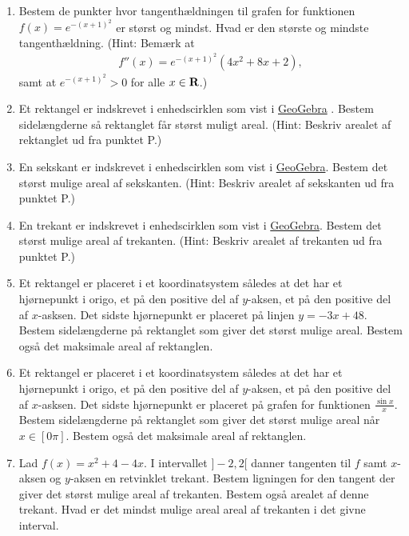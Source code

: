 \begin{enumerate}
	
	\item Bestem de punkter hvor tangenthældningen til grafen for funktionen $f(x)=e^{-(x+1)^2}$ er størst og mindst. Hvad er den største og mindste tangenthældning. (Hint:	Bemærk at 
		\begin{align*}
		f''(x)=e^{-(x+1)^2}(4x^2+8x+2),
		\end{align*}
	samt at $e^{-(x+1)^2}>0$ for alle $x\in \mathbf{R}$.)


	\item Et rektangel er indskrevet i enhedscirklen som vist i \href{https://www.geogebra.org/m/efDNd8KK}{GeoGebra} . Bestem sidelængderne så rektanglet får størst muligt areal. (Hint: Beskriv arealet af rektanglet ud fra punktet P.)
	
	\item En sekskant er indskrevet i enhedscirklen som vist i \href{https://www.geogebra.org/m/efDNd8KK}{GeoGebra}. Bestem det størst mulige areal af sekskanten. (Hint: Beskriv arealet af sekskanten ud fra punktet P.)

	\item En trekant er indskrevet i enhedscirklen som vist i \href{https://www.geogebra.org/m/efDNd8KK}{GeoGebra}. Bestem det størst mulige areal af trekanten. (Hint: Beskriv arealet af trekanten ud fra punktet P.)
	
	\item Et rektangel er placeret i et koordinatsystem således at det har et hjørnepunkt i origo, et på den positive del af $y$-aksen, et på den positive del af $x$-asksen. Det sidste hjørnepunkt er placeret på linjen $y=-3x+48$. Bestem sidelængderne på rektanglet som giver det størst mulige areal. Bestem også det maksimale areal af rektanglen.
	
	\item Et rektangel er placeret i et koordinatsystem således at det har et hjørnepunkt i origo, et på den positive del af $y$-aksen, et på den positive del af $x$-asksen. Det sidste hjørnepunkt er placeret på grafen for funktionen $\frac{\sin x}{x}$. Bestem sidelængderne på rektanglet som giver det størst mulige areal når $x\in[0\pi]$. Bestem også det maksimale areal af rektanglen.
	
	
	\item Lad $f(x)=x^2+4-4x$. I intervallet $]-2,2[ $ danner tangenten til $f$ samt $x$-aksen og $y$-aksen en retvinklet trekant. Bestem ligningen for den tangent der giver det størst mulige areal af trekanten. Bestem også arealet af denne trekant. Hvad er det mindst mulige areal areal af trekanten i det givne interval.
	

\end{enumerate}
